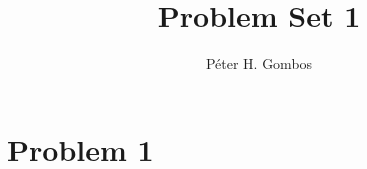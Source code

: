 \documentclass{article}
\title{Problem Set 1}
\author{Péter H. Gombos}
\begin{document}
\maketitle
\section*{Problem 1}
\end{document}
